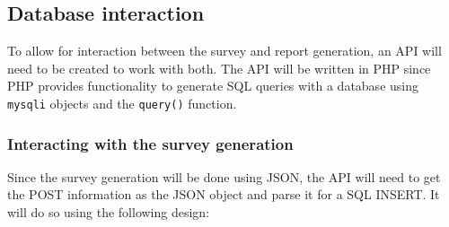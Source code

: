 \documentclass[letterpaper,10pt,serif, draftclsnofoot,onecolumn, compsoc, titlepage]{IEEEtran}
\begin{document}
\subsection{Database interaction}
To allow for interaction between the survey and report generation, an API will need to be created to work with both.
The API will be written in PHP since PHP provides functionality to generate SQL queries with a database using \texttt{mysqli} objects and the \texttt{query()} function.
\subsubsection{Interacting with the survey generation}
Since the survey generation will be done using JSON, the API will need to get the POST information as the JSON object and parse it for a SQL INSERT.
It will do so using the following design:
\end{document}
